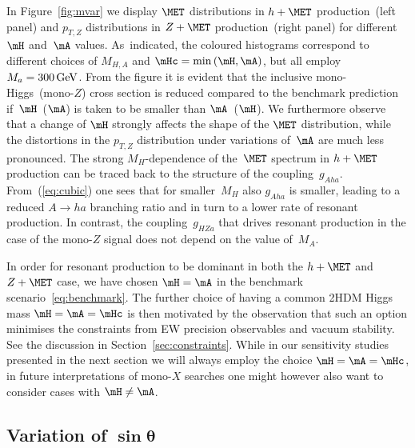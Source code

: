 In Figure~\ref{fig:mvar} we display $\MET$ distributions in $h + \MET$ production~(left panel) and $p_{T,Z}$ distributions in $Z+\MET$ production~(right panel) for different~$\mH$ and~$\mA$ values. As~indicated, the coloured histograms correspond to  different choices of $M_{H,A}$ and $\mHc = {\rm min} \left ( \mH, \mA \right )$, but all employ $M_a = 300 \, {\rm GeV}$. From the figure it is evident that the inclusive mono-Higgs~(mono-$Z$) cross section is reduced compared to the benchmark prediction if~$\mH$~($\mA$) is taken to be smaller than $\mA$~($\mH$). 
We furthermore observe that  a change of $\mH$ strongly affects the shape of the $\MET$ distribution, while the distortions in the $p_{T,Z}$ distribution under variations of~$\mA$ are much less pronounced. The strong $M_H$-dependence of the~$\MET$ spectrum in $h + \MET$ production can be traced back to the structure of the coupling~$g_{Aha}$. From~(\ref{eq:cubic}) one sees that for smaller~$M_H$ also $g_{Aha}$ is smaller, leading to a reduced $A \to ha$ branching ratio  and in turn to a lower rate of resonant production. In contrast, the coupling~$g_{HZa}$ that drives resonant production in the case of the mono-$Z$ signal does not depend on the value of~$M_A$. 

In order for resonant production to be dominant in both the $h + \MET$ and $Z + \MET$ case, we have chosen $\mH = \mA$ in the benchmark scenario~\eqref{eq:benchmark}. The further choice of having a common 2HDM Higgs mass $\mH = \mA = \mHc$ is then motivated by the observation that such an option minimises the constraints from EW precision observables and vacuum stability. See the discussion in Section~\ref{sec:constraints}. While in our sensitivity studies presented in the next section we will always employ the choice $\mH = \mA = \mHc$, in future \hdma  interpretations of mono-$X$ searches one might however  also want to consider cases with $\mH \neq \mA$. 

\subsection*{Variation of $\bm{\sin \theta}$}

